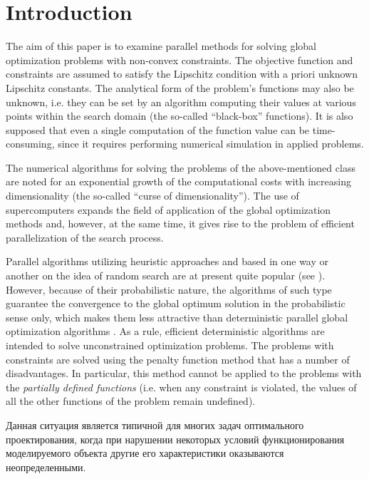 \documentclass[smallextended]{svjour3}       %
\begin{document}
\section{Introduction}
\label{intro}

The aim of this paper is to examine parallel methods for solving global optimization problems with non-convex constraints. The objective function and constraints are assumed to satisfy the Lipschitz condition with a priori unknown Lipschitz constants. The analytical form of the problem's functions may also be unknown, i.e. they can be set by an algorithm computing their values at various points within the search domain (the so-called ``black-box'' functions). It is also supposed that even a single computation of the function value can be time-consuming, since it requires performing numerical simulation in applied problems. 

The numerical algorithms for solving the problems of the above-mentioned class are noted for an exponential growth of the computational costs with increasing dimensionality (the so-called ``curse of dimensionality''). The use of supercomputers expands the field of application of the global optimization methods and, however, at the same time, it gives rise to the problem of efficient parallelization of the search process.

Parallel algorithms utilizing heuristic approaches and based in one way or another on the idea of random search are at present quite popular (see \cite{RefFerreiro,RefZhu,Korosec,Guerrero}). However, because of their probabilistic nature, the algorithms of such type guarantee the convergence to the global optimum solution in the probabilistic sense only, which makes them less attractive than deterministic parallel global optimization algorithms \cite{Jones2001,Paulavicius2011,Evtushenko2013,Strongin2000}. As a rule, efficient deterministic algorithms are intended to solve unconstrained optimization problems. The problems with constraints are solved using the penalty function method that has a number of disadvantages. In particular, this method cannot be applied to the problems with the \textit{partially defined functions} (i.e. when any constraint is violated, the values of all the other functions of the problem remain undefined).

\Russian
Данная ситуация является типичной для многих задач оптимального проектирования, когда при нарушении некоторых условий функционирования моделируемого объекта другие его характеристики оказываются неопределенными.
\end{document}
